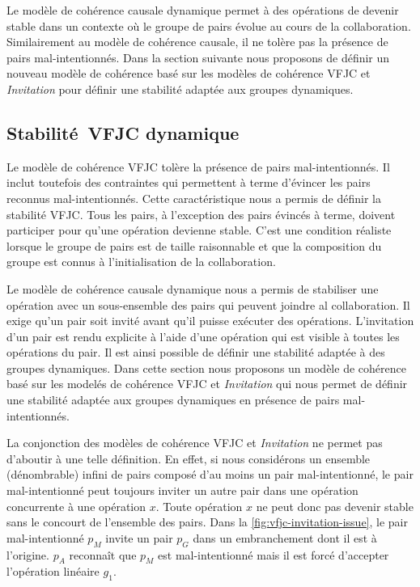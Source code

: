Le modèle de cohérence causale dynamique permet à des opérations de devenir stable dans un contexte où le groupe de pairs évolue au cours de la collaboration.
Similairement au modèle de cohérence causale, il ne tolère pas la présence de pairs mal-intentionnés.
Dans la section suivante nous proposons de définir un nouveau modèle de cohérence basé sur les modèles de cohérence \acs{VFJC} et \emph{Invitation} pour définir une stabilité adaptée aux groupes dynamiques.


\subsection{Stabilité~\acl{VFJC} dynamique}\label{subsec:dvfjcs}

Le modèle de cohérence \ac{VFJC} tolère la présence de pairs mal-intentionnés.
Il inclut toutefois des contraintes qui permettent à terme d'évincer les pairs reconnus mal-intentionnés.
Cette caractéristique nous a permis de définir la stabilité \ac{VFJC}.
Tous les pairs, à l'exception des pairs évincés à terme, doivent participer pour qu'une opération devienne stable.
C'est une condition réaliste lorsque le groupe de pairs est de taille raisonnable et que la composition du groupe est connus à l'initialisation de la collaboration.

Le modèle de cohérence causale dynamique nous a permis de stabiliser une opération avec un sous-ensemble des pairs qui peuvent joindre al collaboration.
Il exige qu'un pair soit invité avant qu'il puisse exécuter des opérations.
L'invitation d'un pair est rendu explicite à l'aide d'une opération qui est visible à toutes les opérations du pair.
Il est ainsi possible de définir une stabilité adaptée à des groupes dynamiques.
Dans cette section nous proposons un modèle de cohérence basé sur les modelés de cohérence \acs{VFJC} et \emph{Invitation} qui nous permet de définir une stabilité adaptée aux groupes dynamiques en présence de pairs mal-intentionnés.

La conjonction des modèles de cohérence \acs{VFJC} et \emph{Invitation} ne permet pas d'aboutir à une telle définition.
En effet, si nous considérons un ensemble (dénombrable) infini de pairs composé d'au moins un pair mal-intentionné, le pair mal-intentionné peut toujours inviter un autre pair dans une opération concurrente à une opération $x$.
Toute opération $x$ ne peut donc pas devenir stable sans le concourt de l'ensemble des pairs.
Dans la \autoref{fig:vfjc-invitation-issue}, le pair mal-intentionné $p_M$ invite un pair $p_G$ dans un embranchement dont il est à l'origine.
$p_A$ reconnaît que $p_M$ est mal-intentionné mais il est forcé d'accepter l'opération linéaire $g_1$.

